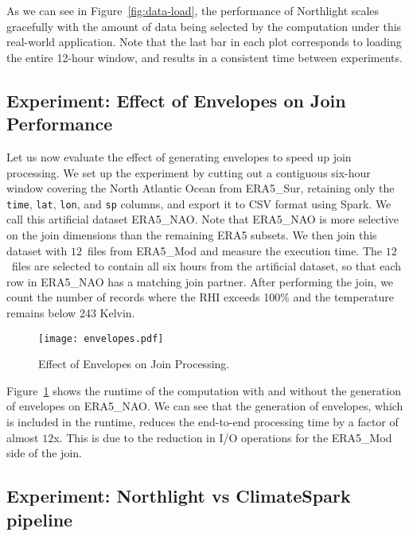 \documentclass[conference]{IEEEtran}
\newcommand{\system}{Northlight}
\newcommand{\smalltt}[1]{{\texttt{\small #1}}}
\begin{document}
As we can see in Figure~\ref{fig:data-load}, the performance of \system{} scales gracefully with the amount of data being selected by the computation under this real-world application. Note that the last bar in each plot corresponds to loading the entire 12-hour window, and results in a consistent time between experiments. 



\vspace*{-0.1cm}
\subsection{Experiment: Effect of Envelopes on Join Performance}

Let us now evaluate the effect of generating envelopes to speed up join processing. 
We set up the experiment by cutting out a contiguous six-hour window covering the North Atlantic Ocean from ERA5\_Sur, retaining only the \smalltt{time}, \smalltt{lat}, \smalltt{lon}, and \smalltt{sp} columns, and export it to CSV format using Spark. We call this artificial dataset ERA5\_NAO. Note that ERA5\_NAO is more selective on the join dimensions than the remaining ERA5 subsets. We then join this dataset with $12$~files from ERA5\_Mod and measure the execution time.
The $12$~files are selected to contain all six hours from the artificial dataset, so that each row in ERA5\_NAO has a matching join partner. After performing the join, we count the number of records where the RHI exceeds 100\% and the temperature remains below 243 Kelvin.

\begin{figure}[h!]
\vspace*{-0.1cm}
\texttt{[image: envelopes.pdf]}
\vspace*{-0.7cm}
\caption{Effect of Envelopes on Join Processing.}
\vspace*{-0.5cm}
\label{fig:envelopes}
\end{figure}

Figure~\ref{fig:envelopes} shows the runtime of the computation with and without the generation of envelopes on ERA5\_NAO. We can see that the generation of envelopes, which is included in the runtime, reduces the end-to-end processing time by a factor of almost $12$x.  This is due to the reduction in I/O operations for the ERA5\_Mod side of the join. 


\subsection{Experiment: \system{} vs ClimateSpark pipeline}
\end{document}
